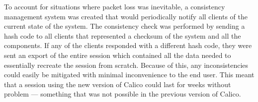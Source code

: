 To account for situations where packet loss was inevitable, a consistency management system was created that would periodically notify all clients of the current state of the system. The consistency check was performed by sending a hash code to all clients that represented a checksum of the system and all the components. If any of the clients responded with a different hash code, they were sent an export of the entire session which contained all the data needed to essentially recreate the session from scratch. Because of this, any inconsistencies could easily be mitigated with minimal inconvenience to the end user. This meant that a session using the new version of Calico could last for weeks without problem --- something that was not possible in the previous version of Calico.







% 












